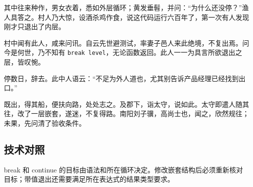 其中往来种作，男女衣着，悉如外层循环；黄发垂髫，并问：“为什么还没停？”渔人具答之。村人乃大惊，设酒杀鸡作食，说这代码运行六百年了，第一次有人发现刚才只退出了内层。

村中闻有此人，咸来问讯。自云先世避测试，率妻子邑人来此绝境，不复出焉。问今是何世，乃不知有 \texttt{break level}，无论函数返回。此人一一为具言所欲退出之层，皆叹惋。

停数日，辞去。此中人语云：“不足为外人道也，尤其别告诉产品经理已经找到出口。”

既出，得其船，便扶向路，处处志之。及郡下，诣太守，说如此。太守即遣人随其往，改了一层嵌套，遂迷，不复得路。南阳刘子骥，高尚士也，闻之，欣然规往；未果，先问清了验收条件。

\subsection*{技术对照}

break 和 continue 的目标由语法和所在循环决定。修改嵌套结构后必须重新核对目标；带值退出还需要满足所在表达式的结果类型要求。
